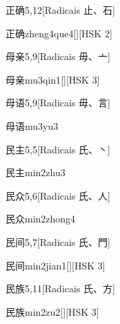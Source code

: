 \begin{entry}{正确}{5,12}[Radicais ⽌、⽯]
  \begin{phonetics}{正确}{zheng4que4}[][HSK 2]
  \end{phonetics}
\end{entry}

\begin{entry}{母亲}{5,9}[Radicais ⽏、⼇]
  \begin{phonetics}{母亲}{mu3qin1}[][HSK 3]
  \end{phonetics}
\end{entry}

\begin{entry}{母语}{5,9}[Radicais ⽏、⾔]
  \begin{phonetics}{母语}{mu3yu3}
  \end{phonetics}
\end{entry}

\begin{entry}{民主}{5,5}[Radicais ⽒、⼂]
  \begin{phonetics}{民主}{min2zhu3}
  \end{phonetics}
\end{entry}

\begin{entry}{民众}{5,6}[Radicais ⽒、⼈]
  \begin{phonetics}{民众}{min2zhong4}
  \end{phonetics}
\end{entry}

\begin{entry}{民间}{5,7}[Radicais ⽒、⾨]
  \begin{phonetics}{民间}{min2jian1}[][HSK 3]
  \end{phonetics}
\end{entry}

\begin{entry}{民族}{5,11}[Radicais ⽒、⽅]
  \begin{phonetics}{民族}{min2zu2}[][HSK 3]
  \end{phonetics}
\end{entry}

